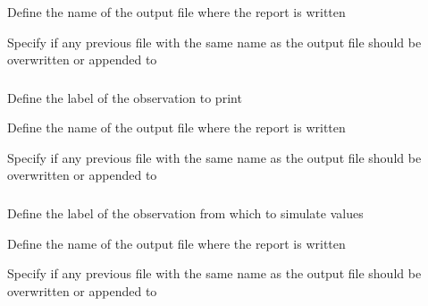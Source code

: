  {Define the name of the output file where the report is written}

 {Specify if any previous file with the same name as the output file should be overwritten or appended to}

\subsubsection[Print a summary of the an observation, including fits, and residuals]{}

 {Define the label of the observation to print}

 {Define the name of the output file where the report is written}

 {Specify if any previous file with the same name as the output file should be overwritten or appended to}

\subsubsection[Print an observation using simulated values]{}

 {Define the label of the observation from which to simulate values}

 {Define the name of the output file where the report is written}

 {Specify if any previous file with the same name as the output file should be overwritten or appended to}

\subsubsection[Print an ageing error misclassification matrix]{}

